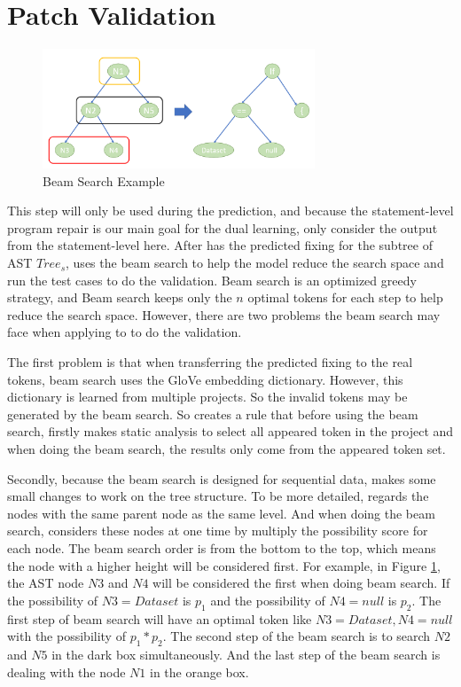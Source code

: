 \section{Patch Validation}

\begin{figure}[t]
	\centering
	\includegraphics[width=3.2in]{graphs/beam.png}
	\caption{Beam Search Example}
	\label{patch-validation}
\end{figure}

This step will only be used during the prediction, and because the statement-level program repair is our main goal for the dual learning, \tool only consider the output from the statement-level here. After \tool has the predicted fixing for the subtree of AST $Tree_s$, \tool uses the beam search to help the model reduce the search space and run the test cases to do the validation. Beam search is an optimized greedy strategy, and Beam search keeps only the $n$ optimal tokens for each step to help reduce the search space. However, there are two problems the beam search may face when applying to \tool to do the validation.

The first problem is that when transferring the predicted fixing to the real tokens, beam search uses the GloVe embedding dictionary. However, this dictionary is learned from multiple projects. So the invalid tokens may be generated by the beam search. So \tool creates a rule that before using the beam search, \tool firstly makes static analysis to select all appeared token in the project and when doing the beam search, the results only come from the appeared token set.

Secondly, because the beam search is designed for sequential data, \tool makes some small changes to work on the tree structure. To be more detailed, \tool regards the nodes with the same parent node as the same level. And when doing the beam search, \tool considers these nodes at one time by multiply the possibility score for each node. The beam search order is from the bottom to the top, which means the node with a higher height will be considered first. For example, in Figure \ref{patch-validation}, the AST node $N3$ and $N4$ will be considered the first when doing beam search. If the possibility of $N3=Dataset$ is $p_1$ and the possibility of $N4=null$ is $p_2$. The first step of beam search will have an optimal token like $N3=Dataset, N4=null$ with the possibility of $p_1*p_2$. The second step of the beam search is to search $N2$ and $N5$ in the dark box simultaneously. And the last step of the beam search is dealing with the node $N1$ in the orange box. 

